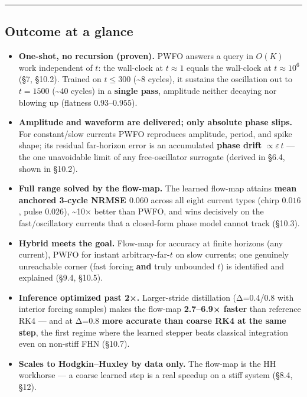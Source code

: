 \documentclass[
  11pt,
]{article}
\providecommand{\tightlist}{%
  \setlength{\itemsep}{0pt}\setlength{\parskip}{0pt}}
\begin{document}
\begin{center}\rule{0.5\linewidth}{0.5pt}\end{center}

\subsection{Outcome at a glance}\label{outcome-at-a-glance}

\begin{itemize}
\tightlist
\item
  \textbf{One-shot, no recursion (proven).} PWFO answers a query in
  \(O(K)\) work independent of \(t\): the wall-clock at \(t\approx 1\)
  equals the wall-clock at \(t\approx 10^6\) (§7, §10.2). Trained on
  \(t\le 300\) (\textasciitilde8 cycles), it sustains the oscillation
  out to \(t=1500\) (\textasciitilde40 cycles) in a \textbf{single
  pass}, amplitude neither decaying nor blowing up (flatness
  \(0.93\)--\(0.955\)).
\item
  \textbf{Amplitude and waveform are delivered; only absolute phase
  slips.} For constant/slow currents PWFO reproduces amplitude, period,
  and spike shape; its residual far-horizon error is an accumulated
  \textbf{phase drift} \(\propto \varepsilon\, t\) --- the one
  unavoidable limit of any free-oscillator surrogate (derived in §6.4,
  shown in §10.2).
\item
  \textbf{Full range solved by the flow-map.} The learned flow-map
  attains \textbf{mean anchored 3-cycle NRMSE \(0.060\)} across all
  eight current types (chirp \(0.016\), pulse \(0.026\)),
  \textasciitilde10× better than PWFO, and wins decisively on the
  fast/oscillatory currents that a closed-form phase model cannot track
  (§10.3).
\item
  \textbf{Hybrid meets the goal.} Flow-map for accuracy at finite
  horizons (any current), PWFO for instant arbitrary-far-\(t\) on slow
  currents; one genuinely unreachable corner (fast forcing \textbf{and}
  truly unbounded \(t\)) is identified and explained (§9.4, §10.5).
\item
  \textbf{Inference optimized past 2×.} Larger-stride distillation
  (Δ=0.4/0.8 with interior forcing samples) makes the flow-map
  \textbf{2.7--6.9× faster} than reference RK4 --- and at Δ=0.8
  \textbf{more accurate than coarse RK4 at the same step}, the first
  regime where the learned stepper beats classical integration even on
  non-stiff FHN (§10.7).
\item
  \textbf{Scales to Hodgkin--Huxley by data only.} The flow-map is the
  HH workhorse --- a coarse learned step is a real speedup on a stiff
  system (§8.4, §12).
\end{itemize}
\end{document}

